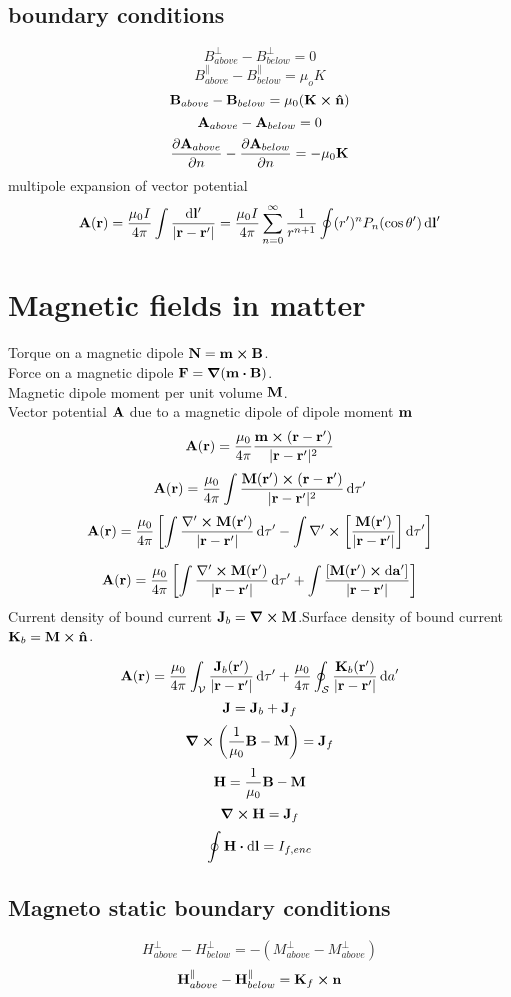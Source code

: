 \documentclass[12pt]{article}
\begin{document}
\subsection*{boundary conditions}
\[B^{\perp}_{above}-B^{\perp}_{below}=0\]
\[B^{\parallel}_{above}-B^{\parallel}_{below}=\mu_oK\]
\[\vb{B}_{above}-\vb{B}_{below}=\mu_0(\vb{K}\cp\vu{n})\]
\[\vb{A}_{above}-\vb{A}_{below}=0\]
\[\pdv{\vb{A}_{above}}{n}-\pdv{\vb{A}_{below}}{n}=-\mu_0\vb{K}\]
multipole expansion of vector potential\[\vb{A(\vb{r})}=\frac{\mu_0I}{4\pi}\int\frac{\dd{\vb{l}'}}{|\vb{r}-\vb{r'}|}=\frac{\mu_0I}{4\pi}\sum_{n=0}^{\infty}\frac{1}{r^{n+1}}\oint(r')^nP_n(\cos\theta')\dd{\vb{l'}}\]

\section{Magnetic fields in matter}
Torque on a magnetic dipole $\vb{N}=\vb{m}\cp\vb{B}$.\\
Force on a magnetic dipole $\vb{F}=\grad(\vb{m}\vdot\vb{B})$.\\
Magnetic dipole moment per unit volume $\vb{M}$.\\
Vector potential $\vb{A}$ due to a magnetic dipole of dipole moment $\vb{m}$ \[\vb{A}(\vb{r})=\frac{\mu_0}{4\pi}\frac{\vb{m}\cp(\vb{r}-\vb{r}')}{|\vb{r}-\vb{r}'|^2}\]
\[\vb{A}(\vb{r})=\frac{\mu_0}{4\pi}\int\frac{\vb{M}(\vb{r'})\cp(\vb{r}-\vb{r}')}{|\vb{r}-\vb{r}'|^2}\dd{\tau'}\]
\[\vb{A}(\vb{r})=\frac{\mu_0}{4\pi}\left[\int\frac{\mathbf{\nabla'}\cp{\vb{M}(\vb{r'})}}{|\vb{r}-\vb{r}'|}\dd{\tau'}-\int\mathbf{\nabla'}\cp\left[{\frac{\vb{M}(\vb{r'})}{|\vb{r}-\vb{r}'|}}\right]\dd{\tau'}\right]\]

\[\vb{A}(\vb{r})=\frac{\mu_0}{4\pi}\left[\int\frac{\mathbf{\nabla'}\cp{\vb{M}(\vb{r'})}}{|\vb{r}-\vb{r}'|}\dd{\tau'}+\int\frac{[{\vb{M}(\vb{r'})}\cp\dd{\vb{a}'}]}{|\vb{r}-\vb{r}'|}\right]\]
Current density of bound current $\vb{J}_b=\curl{\vb{M}}$.Surface density of bound current $\vb{K}_b=\vb{M}\cp\vu{n}$.

\[\vb{A}(\vb{r})=\frac{\mu_0}{4\pi}\int_{\mathcal{V}}\frac{\vb{J}_b(\vb{r}')}{|\vb{r}-\vb{r}'|}\dd{\tau'}+\frac{\mu_0}{4\pi}\oint_{\mathcal{S}}\frac{\vb{K}_b(\vb{r}')}{|\vb{r}-\vb{r}'|}\dd{a}'\]
\[\vb{J}=\vb{J}_b+\vb{J}_f\]
\[\curl{\qty(\frac{1}{\mu_0}\vb{B}-\vb{M})}=\vb{J}_f\]
\[\vb{H}=\frac{1}{\mu_0}\vb{B}-\vb{M}\]
\[\curl{\vb{H}}=\vb{J}_f\]
\[\oint\vb{H}\vdot\dd{\vb{l}}=I_{f,enc}\]
\subsection*{Magneto static boundary conditions}
\[H_{above}^{\perp}-H_{below}^{\perp}=-(M_{above}^{\perp}-M_{above}^{\perp})\]
\[\vb{H}_{above}^{\parallel}-\vb{H}_{below}^{\parallel}=\vb{K}_f\cp\vb{n}\]
\end{document}
